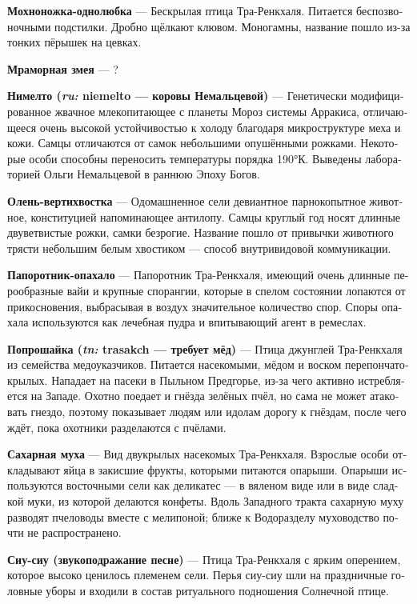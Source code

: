 \documentclass[a4paper,12pt,fleqn]{book}\usepackage{cooltooltips}\usepackage{polyglossia}\setdefaultlanguage[babelshorthands=true]{russian}\setotherlanguage{english}\defaultfontfeatures{Ligatures=TeX,Mapping=tex-text} \usepackage{xcolor}\definecolor{lightgray}{HTML}{bbbbbb}\color{lightgray}\newcommand{\ml}[3]{\textenglish{\textcolor{black}{#3}}}
\newcommand{\theterm}[3]{\textbf{\hypertarget{#1}{#2}} --- #3}
\newcommand{\theorigin}[3]{\textit{#1:} #2 --- #3}
\begin{document}
\theterm{one-love-furfeet}
{Мохноножка-однолюбка}
{Бескрылая птица Тра-Ренкхаля.
Питается беспозвоночными подстилки.
Дробно щёлкают клювом.
Моногамны, название пошло из-за тонких пёрышек на цевках.}

\theterm{marblesnake}
{Мраморная змея}
{?}

\theterm{niemelto}
{Нимелто (\theorigin{ru}{niemelto}{коровы Немальцевой})}
{Генетически модифицированное жвачное млекопитающее с планеты Мороз системы Арракиса, отличающееся очень высокой устойчивостью к холоду благодаря микроструктуре меха и кожи.
Самцы отличаются от самок небольшими опушёнными рожками. Некоторые особи способны переносить температуры порядка 190°К.
Выведены лабораторией Ольги Немальцевой в раннюю Эпоху Богов.}

\theterm{fiddletail-deer}
{Олень-вертихвостка}
{Одомашненное сели девиантное парнокопытное животное, конституцией напоминающее антилопу.
Самцы круглый год носят длинные двуветвистые рожки, самки безрогие.
Название пошло от привычки животного трясти небольшим белым хвостиком --- способ внутривидовой коммуникации.}

\theterm{swing-around}
{Папоротник-опахало}
{Папоротник Тра-Ренкхаля, имеющий очень длинные перообразные вайи и крупные спорангии, которые в спелом состоянии лопаются от прикосновения, выбрасывая в воздух значительное количество спор.
Споры опахала используются как лечебная пудра и впитывающий агент в ремеслах.}

\theterm{beggarbird}
{Попрошайка (\theorigin{tn}{trasakch}{требует мёд})}
{Птица джунглей Тра-Ренкхаля из семейства медоуказчиков.
Питается насекомыми, мёдом и воском перепончатокрылых.
Нападает на пасеки в Пыльном Предгорье, из-за чего активно истребляется на Западе.
Охотно поедает и гнёзда зелёных пчёл, но сама не может атаковать гнездо, поэтому показывает людям или идолам дорогу к гнёздам, после чего ждёт, пока охотники разделаются с пчёлами.}

\theterm{sugarfly}
{Сахарная муха}
{Вид двукрылых насекомых Тра-Ренкхаля.
Взрослые особи откладывают яйца в закисшие фрукты, которыми питаются опарыши.
Опарыши используются восточными сели как деликатес --- в вяленом виде или в виде сладкой муки, из которой делаются конфеты.
Вдоль Западного тракта сахарную муху разводят пчеловоды вместе с мелипоной;
ближе к Водоразделу муховодство почти не распространено.}

\theterm{siu-siu}
{Сиу-сиу (звукоподражание песне)}
{Птица Тра-Ренкхаля с ярким оперением, которое высоко ценилось племенем сели.
Перья сиу-сиу шли на праздничные головные уборы и входили в состав ритуального подношения Солнечной птице.}
\end{document}
